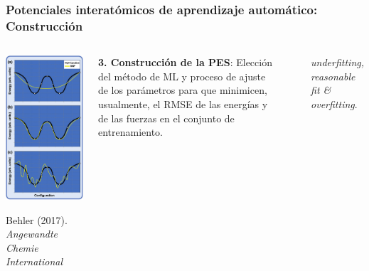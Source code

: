 \documentclass[aspectratio=169]{beamer}
\let\oldtextbf\textbf
\renewcommand{\textbf}[1]{\textcolor{nordblue}{\oldtextbf{#1}}}
\begin{document}
    \begin{frame}
        \frametitle{Potenciales interatómicos de aprendizaje automático: Construcción}

        \begin{columns}
            \begin{center}
                \includegraphics[width=0.65\columnwidth]{intro-fitting.png}
                
                \tiny{Behler (2017). \textit{Angewandte Chemie International}}
            \end{center}

            \textbf{3. Construcción de la PES}: Elección del método de ML y 
            proceso de ajuste de los parámetros para que minimicen, usualmente, 
            el RMSE de las energías y de las fuerzas en el conjunto de 
            entrenamiento.

            \

            \textit{underfitting, reasonable fit \& overfitting}.
        \end{columns}

	\end{frame}
    
\end{document}
